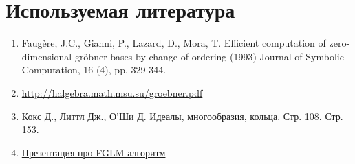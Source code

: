 \documentclass{article}
\begin{document}
\section{Используемая литература}
\begin{enumerate}
    \item Faugère, J.C., Gianni, P., Lazard, D., Mora, T. Efficient computation of zero-dimensional gröbner bases by change of ordering (1993) Journal of Symbolic Computation, 16 (4), pp. 329-344.
    \item \href{http://halgebra.math.msu.su/groebner.pdf}{http://halgebra.math.msu.su/groebner.pdf}
    \item Кокс Д., Литтл Дж., О'Ши Д. Идеалы, многообразия, кольца. Стр. 108. Стр. 153. 
    \item \href{https://www.math.lsu.edu/system/files/Groeb_presentation_final.pdf}{Презентация про FGLM алгоритм}
\end{enumerate}
\end{document}
